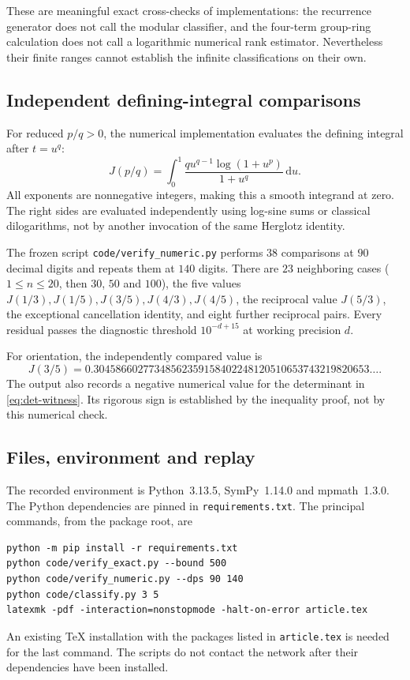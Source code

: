 \documentclass[11pt]{article}
\numberwithin{equation}{section}
\theoremstyle{definition}
\theoremstyle{remark}
\newcommand{\dd}{\,\mathrm d}
\begin{document}
These are meaningful exact cross-checks of implementations: the
recurrence generator does not call the modular classifier, and the
four-term group-ring calculation does not call a logarithmic numerical
rank estimator. Nevertheless their finite ranges cannot establish the
infinite classifications on their own.

\subsection{Independent defining-integral comparisons}

For reduced $p/q>0$, the numerical implementation evaluates the defining
integral after $t=u^q$:
\begin{equation}\label{eq:numeric-integral}
 J(p/q)=\int_0^1
       \frac{q u^{q-1}\log(1+u^p)}{1+u^q}\dd u.
\end{equation}
All exponents are nonnegative integers, making this a smooth integrand
at zero. The right sides are evaluated independently using log-sine
sums or classical dilogarithms, not by another invocation of the same
Herglotz identity.

The frozen script \nolinkurl{code/verify_numeric.py} performs $38$
comparisons at $90$ decimal digits and repeats them at $140$ digits.
There are $23$ neighboring cases ($1\le n\le20$, then $30$, $50$ and
$100$), the five values $J(1/3),J(1/5),J(3/5),J(4/3),J(4/5)$, the
reciprocal value $J(5/3)$, the exceptional cancellation identity, and
eight further reciprocal pairs. Every residual passes the diagnostic
threshold $10^{-d+15}$ at working precision $d$.

For orientation, the independently compared value is
\[
 J(3/5)=0.30458660277348562359158402248120510653743219820653\ldots.
\]
The output also records a negative numerical value for the determinant
in \eqref{eq:det-witness}. Its rigorous sign is established by the
inequality proof, not by this numerical check.

\subsection{Files, environment and replay}

The recorded environment is Python~3.13.5, SymPy~1.14.0 and
mpmath~1.3.0. The Python dependencies are pinned in
\nolinkurl{requirements.txt}. The principal commands, from the package
root, are
\begin{verbatim}
python -m pip install -r requirements.txt
python code/verify_exact.py --bound 500
python code/verify_numeric.py --dps 90 140
python code/classify.py 3 5
latexmk -pdf -interaction=nonstopmode -halt-on-error article.tex
\end{verbatim}
An existing TeX installation with the packages listed in
\nolinkurl{article.tex} is needed for the last command. The scripts do
not contact the network after their dependencies have been installed.
\end{document}
